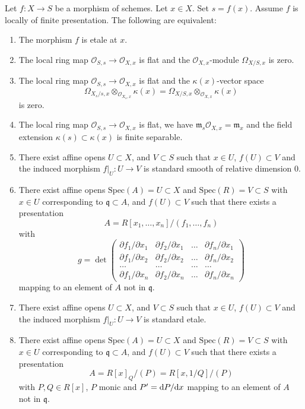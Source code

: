 \begin{lemma}
\label{lemma-etale-at-point}
Let $f : X \to S$ be a morphism of schemes.
Let $x \in X$.
Set $s = f(x)$.
Assume $f$ is locally of finite presentation.
The following are equivalent:
\begin{enumerate}
\item The morphism $f$ is etale at $x$.
\item The local ring map $\mathcal{O}_{S, s} \to \mathcal{O}_{X, x}$
is flat and the $\mathcal{O}_{X, x}$-module $\Omega_{X/S, x}$
is zero.
\item The local ring map $\mathcal{O}_{S, s} \to \mathcal{O}_{X, x}$
is flat and the $\kappa(x)$-vector space
$$
\Omega_{X_s/s, x} \otimes_{\mathcal{O}_{X_s, x}} \kappa(x) =
\Omega_{X/S, x} \otimes_{\mathcal{O}_{X, x}} \kappa(x)
$$
is zero.
\item The local ring map $\mathcal{O}_{S, s} \to \mathcal{O}_{X, x}$
is flat, we have $\mathfrak m_s\mathcal{O}_{X, x} = \mathfrak m_x$ and
the field extension $\kappa(s) \subset \kappa(x)$ is finite
separable.
\item There exist affine opens $U \subset X$,
and $V \subset S$ such that $x \in U$, $f(U) \subset V$ and the
induced morphism $f|_U : U \to V$ is standard smooth
of relative dimension $0$.
\item There exist affine opens $\text{Spec}(A) = U \subset X$
and $\text{Spec}(R) = V \subset S$ with $x \in U$ corresponding
to $\mathfrak q \subset A$, and $f(U) \subset V$
such that there exists a presentation
$$
A = R[x_1, \ldots, x_n]/(f_1, \ldots, f_n)
$$
with
$$
g =
\det
\left(
\begin{matrix}
\partial f_1/\partial x_1 &
\partial f_2/\partial x_1 &
\ldots &
\partial f_n/\partial x_1 \\
\partial f_1/\partial x_2 &
\partial f_2/\partial x_2 &
\ldots &
\partial f_n/\partial x_2 \\
\ldots & \ldots & \ldots & \ldots \\
\partial f_1/\partial x_n &
\partial f_2/\partial x_n &
\ldots &
\partial f_n/\partial x_n
\end{matrix}
\right)
$$
mapping to an element of $A$ not in $\mathfrak q$.
\item There exist affine opens $U \subset X$,
and $V \subset S$ such that $x \in U$, $f(U) \subset V$ and the
induced morphism $f|_U : U \to V$ is standard etale.
\item There exist affine opens $\text{Spec}(A) = U \subset X$
and $\text{Spec}(R) = V \subset S$ with $x \in U$ corresponding
to $\mathfrak q \subset A$, and $f(U) \subset V$
such that there exists a presentation
$$
A = R[x]_Q/(P) = R[x, 1/Q]/(P)
$$
with $P, Q \in R[x]$, $P$ monic and $P' = {\rm d}P/{\rm d}x$ mapping to
an element of $A$ not in $\mathfrak q$.
\end{enumerate}
\end{lemma}


